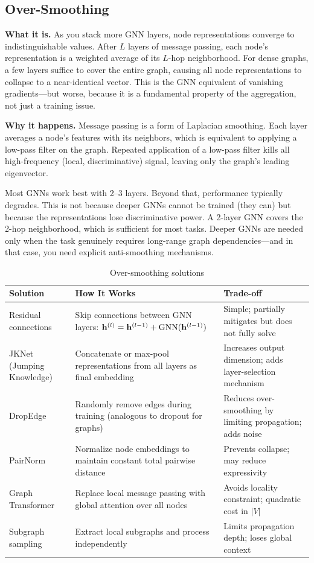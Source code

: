 \subsection{Over-Smoothing}

\textbf{What it is.} As you stack more GNN layers, node representations converge to indistinguishable values. After $L$ layers of message passing, each node's representation is a weighted average of its $L$-hop neighborhood. For dense graphs, a few layers suffice to cover the entire graph, causing all node representations to collapse to a near-identical vector. This is the GNN equivalent of vanishing gradients---but worse, because it is a fundamental property of the aggregation, not just a training issue.

\textbf{Why it happens.} Message passing is a form of Laplacian smoothing. Each layer averages a node's features with its neighbors, which is equivalent to applying a low-pass filter on the graph. Repeated application of a low-pass filter kills all high-frequency (local, discriminative) signal, leaving only the graph's leading eigenvector.

\begin{keyinsight}
Most GNNs work best with 2--3 layers. Beyond that, performance typically degrades. This is not because deeper GNNs cannot be trained (they can) but because the representations lose discriminative power. A 2-layer GNN covers the 2-hop neighborhood, which is sufficient for most tasks. Deeper GNNs are needed only when the task genuinely requires long-range graph dependencies---and in that case, you need explicit anti-smoothing mechanisms.
\end{keyinsight}

\begin{table}[H]
\centering
\caption{Over-smoothing solutions}
\begin{tabularx}{\textwidth}{lXX}
\toprule
\textbf{Solution} & \textbf{How It Works} & \textbf{Trade-off} \\
\midrule
Residual connections & Skip connections between GNN layers: $\mathbf{h}^{(l)} = \mathbf{h}^{(l-1)} + \text{GNN}(\mathbf{h}^{(l-1)})$ & Simple; partially mitigates but does not fully solve \\
JKNet (Jumping Knowledge) & Concatenate or max-pool representations from all layers as final embedding & Increases output dimension; adds layer-selection mechanism \\
DropEdge & Randomly remove edges during training (analogous to dropout for graphs) & Reduces over-smoothing by limiting propagation; adds noise \\
PairNorm & Normalize node embeddings to maintain constant total pairwise distance & Prevents collapse; may reduce expressivity \\
Graph Transformer & Replace local message passing with global attention over all nodes & Avoids locality constraint; quadratic cost in $|V|$ \\
Subgraph sampling & Extract local subgraphs and process independently & Limits propagation depth; loses global context \\
\bottomrule
\end{tabularx}
\end{table}


